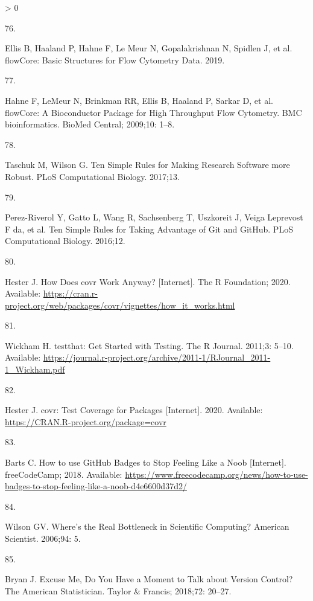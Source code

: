 \documentclass[10pt,letterpaper]{article}
\newlength{\csllabelwidth}
\newlength{\cslhangindent}
\newenvironment{CSLReferences}[3] %
 {%
  \setlength{\parindent}{0pt}
  \ifodd #1 \everypar{\setlength{\hangindent}{\cslhangindent}}\ignorespaces\fi
  \ifnum #2 > 0
  \setlength{\parskip}{#2\baselineskip}
  \fi
 }%
 {}
\newcommand{\CSLLeftMargin}[1]{\parbox[t]{\csllabelwidth}{#1}}
\newcommand{\CSLRightInline}[1]{\parbox[t]{\linewidth - \csllabelwidth}{#1}}
\begin{document}
\begin{CSLReferences}{0}{0}
\leavevmode\hypertarget{ref-flowCore}{}%
\CSLLeftMargin{76. }
\CSLRightInline{Ellis B, Haaland P, Hahne F, Le Meur N, Gopalakrishnan
N, Spidlen J, et al. {flowCore: Basic Structures for Flow Cytometry
Data}. 2019. }

\leavevmode\hypertarget{ref-hahne2009}{}%
\CSLLeftMargin{77. }
\CSLRightInline{Hahne F, LeMeur N, Brinkman RR, Ellis B, Haaland P,
Sarkar D, et al. {flowCore: A Bioconductor Package for High Throughput
Flow Cytometry}. BMC bioinformatics. BioMed Central; 2009;10: 1--8. }

\leavevmode\hypertarget{ref-taschuk2017}{}%
\CSLLeftMargin{78. }
\CSLRightInline{Taschuk M, Wilson G. {Ten Simple Rules for Making
Research Software more Robust}. PLoS Computational Biology. 2017;13. }

\leavevmode\hypertarget{ref-perez2016}{}%
\CSLLeftMargin{79. }
\CSLRightInline{Perez-Riverol Y, Gatto L, Wang R, Sachsenberg T,
Uszkoreit J, Veiga Leprevost F da, et al. {Ten Simple Rules for Taking
Advantage of Git and GitHub}. PLoS Computational Biology. 2016;12. }

\leavevmode\hypertarget{ref-hester2020}{}%
\CSLLeftMargin{80. }
\CSLRightInline{Hester J. {How Does covr Work Anyway?} {[}Internet{]}.
The R Foundation; 2020. Available:
\url{https://cran.r-project.org/web/packages/covr/vignettes/how_it_works.html}}

\leavevmode\hypertarget{ref-wickham2011}{}%
\CSLLeftMargin{81. }
\CSLRightInline{Wickham H. {testthat: Get Started with Testing}. The R
Journal. 2011;3: 5--10. Available:
\url{https://journal.r-project.org/archive/2011-1/RJournal_2011-1_Wickham.pdf}}

\leavevmode\hypertarget{ref-covr}{}%
\CSLLeftMargin{82. }
\CSLRightInline{Hester J. {covr: Test Coverage for Packages}
{[}Internet{]}. 2020. Available:
\url{https://CRAN.R-project.org/package=covr}}

\leavevmode\hypertarget{ref-barts2018}{}%
\CSLLeftMargin{83. }
\CSLRightInline{Barts C. {How to use GitHub Badges to Stop Feeling Like
a Noob} {[}Internet{]}. freeCodeCamp; 2018. Available:
\url{https://www.freecodecamp.org/news/how-to-use-badges-to-stop-feeling-like-a-noob-d4e6600d37d2/}}

\leavevmode\hypertarget{ref-wilson2006}{}%
\CSLLeftMargin{84. }
\CSLRightInline{Wilson GV. {Where's the Real Bottleneck in Scientific
Computing?} American Scientist. 2006;94: 5. }

\leavevmode\hypertarget{ref-bryan2018}{}%
\CSLLeftMargin{85. }
\CSLRightInline{Bryan J. {Excuse Me, Do You Have a Moment to Talk about
Version Control?} The American Statistician. Taylor \& Francis; 2018;72:
20--27. }


\end{CSLReferences}
\end{document}
